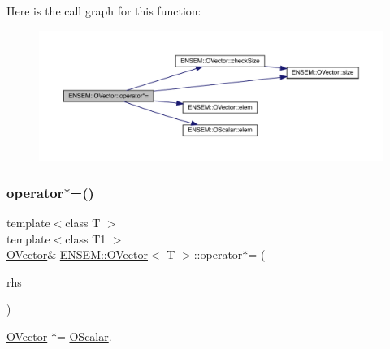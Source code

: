 Here is the call graph for this function\+:
\nopagebreak
\begin{figure}[H]
\begin{center}
\leavevmode
\includegraphics[width=350pt]{d0/d8d/classENSEM_1_1OVector_a55710cffaf6c877d2465af80ad8b6c49_cgraph}
\end{center}
\end{figure}
\mbox{\label{classENSEM_1_1OVector_a55710cffaf6c877d2465af80ad8b6c49}} 
\subsubsection{\texorpdfstring{operator$\ast$=()}{operator*=()}\hspace{0.1cm}{\footnotesize\ttfamily [3/6]}}
{\footnotesize\ttfamily template$<$class T $>$ \\
template$<$class T1 $>$ \\
\mbox{\hyperlink{classENSEM_1_1OVector}{O\+Vector}}\& \mbox{\hyperlink{classENSEM_1_1OVector}{E\+N\+S\+E\+M\+::\+O\+Vector}}$<$ T $>$\+::operator$\ast$= (\begin{DoxyParamCaption}\item[{const \mbox{\hyperlink{classENSEM_1_1OScalar}{O\+Scalar}}$<$ T1 $>$ \&}]{rhs }\end{DoxyParamCaption})\hspace{0.3cm}{\ttfamily [inline]}}



\mbox{\hyperlink{classENSEM_1_1OVector}{O\+Vector}} $\ast$= \mbox{\hyperlink{classENSEM_1_1OScalar}{O\+Scalar}}. 

